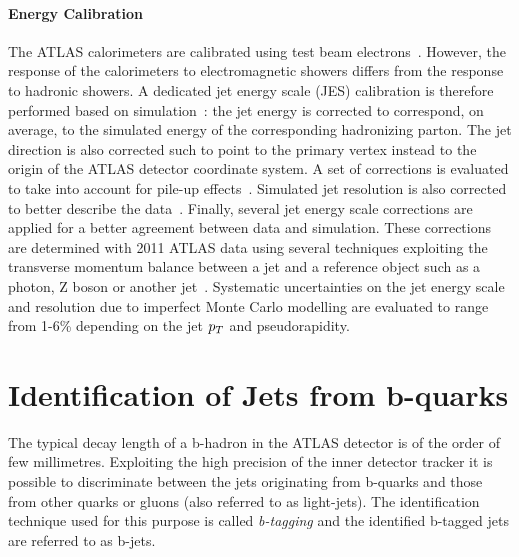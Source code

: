\paragraph{Energy Calibration}
The ATLAS calorimeters are calibrated using test beam electrons~\cite{EMcalibration}. However,  the response of the calorimeters
to electromagnetic showers  differs from the response to hadronic showers. A dedicated jet energy scale
(JES) calibration is therefore performed based on simulation~\cite{jesinsitu}: 
the  jet energy is corrected to correspond, on average, to the simulated energy 
of the corresponding hadronizing parton. The jet direction  is also corrected such to point
to the primary vertex instead to the origin of the ATLAS detector coordinate system. A set of corrections is evaluated to take into account
for pile-up effects~\cite{jespileup, jesarea}. Simulated jet resolution is also corrected to better describe the data~\cite{jer}. 
Finally, several jet energy scale corrections are applied for a better agreement between 
data and simulation. These corrections are determined with 2011 ATLAS data using several techniques
exploiting the transverse momentum balance between a jet and a reference object such as a
photon, Z boson or another jet~\cite{jesinsitu, JES}. Systematic uncertainties on the jet energy scale and resolution  due to  
imperfect Monte Carlo modelling are evaluated to range from 1-6\% depending on the jet $p_{T}$ and pseudorapidity.


\section{Identification of Jets from b-quarks}
The typical decay length of a b-hadron in the  ATLAS detector is of the order of few millimetres. Exploiting the high precision of the
inner detector tracker it is possible to discriminate between the  jets originating from b-quarks 
and those from other quarks or gluons (also referred to as light-jets). The identification technique used for this purpose is called \emph{b-tagging}
and the identified b-tagged jets are referred to as b-jets.

